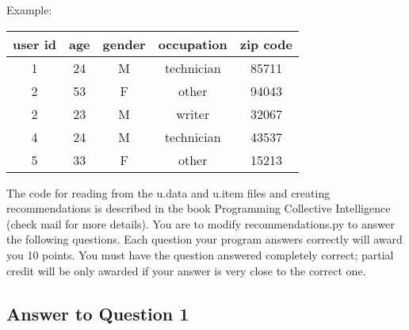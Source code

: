 \documentclass{article}
\begin{document}
Example: \\

\begin{table}[!h]
\centering
\begin{tabular}{c c c c c}
user id & age &  gender & occupation & zip code \\
\hline
1 & 24 & M & technician & 85711 \\
2 & 53 & F & other & 94043 \\
2 & 23 & M & writer & 32067 \\
4 & 24 & M & technician & 43537 \\
5 & 33 & F & other & 15213 \\
\end{tabular}
\end{table}

The code for reading from the u.data and u.item files and creating recommendations is described in the book Programming Collective Intelligence (check mail for more details). You are to modify recommendations.py to answer the following questions. Each question your program answers correctly will award you 10 points. You must have the question answered completely correct; partial credit will be only awarded if your answer is very close to the correct one.

\subsection*{Answer to Question 1}




\end{document}
